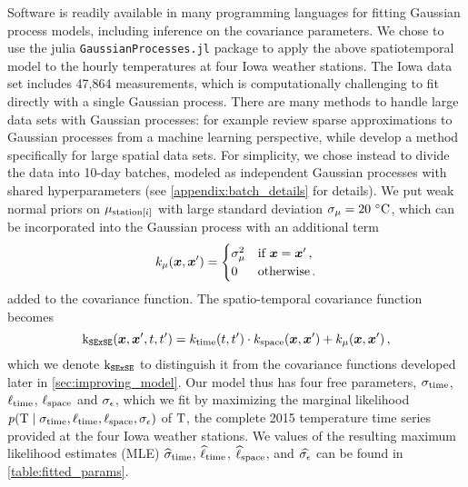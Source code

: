 Software is readily available in many programming languages for fitting Gaussian process models, including inference on the covariance parameters. We chose to use the julia \texttt{GaussianProcesses.jl} package \citep{fairbrother2018gaussianprocesses} to apply the above spatiotemporal model to the hourly temperatures at four Iowa weather stations.
The Iowa data set includes 47,864 measurements, which is computationally challenging to fit directly with a single Gaussian process.
There are many methods to handle large data sets with Gaussian processes: for example \citet{quinonero2007approximation} review sparse approximations to Gaussian processes from a machine learning perspective, while \citet{banerjee2008gaussian} develop a method specifically for large spatial data sets.
For simplicity, we chose instead to divide the data into 10-day batches, modeled as independent Gaussian processes with shared hyperparameters (see \autoref{appendix:batch_details} for details).
We put weak normal priors on \(\mu_{\mathrm{station}\left\lbrack i\right\rbrack}\) with large standard deviation \(\sigma_{\mu}=20\,{\,^\circ}{}\mathrm{C}\), which can be incorporated into the Gaussian process with an additional term
\begin{equation}
    k_{\mu}(\bm{x}, \bm{x}') = \begin{cases}
\sigma_\mu^2 &\text{if } \bm{x} = \bm{x}'\,, \\
0 &\text{otherwise}\,.
\end{cases}
\end{equation}
added to the covariance function.
The spatio-temporal covariance function becomes
\begin{equation}
    \operatorname{k_{\mathtt{SExSE}}}(\bm{x},\bm{x}',t,t') = k_{\mathrm{time}}(t,t') \cdot k_{\mathrm{space}}(\bm{x}, \bm{x}') + k_\mu(\bm{x}, \bm{x}') \,,
    \label{eq:ksese}
\end{equation}
which we denote \(\operatorname{k_{\mathtt{SExSE}}}\) to distinguish it from the covariance functions developed later in \autoref{sec:improving_model}.
Our model thus has four free parameters, \(\sigma_{\mathrm{time}}\), \(\ell_{\mathrm{time}}\), \(\ell_{\mathrm{space}}\) and \(\sigma_{\epsilon}\), which we fit by maximizing the marginal likelihood \( \prob\del{ \Temp \mid {\sigma_{\subtime},\ell_{\subtime},\ell_{\subspace},\sigman} }\) of \(\mathrm{T}\), the complete 2015 temperature time series provided at the four Iowa weather stations.
We values of the resulting maximum likelihood estimates (MLE) 
\(\widehat\sigma_{\mathrm{time}}\), \(\widehat\ell_{\mathrm{time}}\), \(\widehat\ell_{\mathrm{space}}\), and \(\widehat{\sigma_{\epsilon}}\)
can be found in \autoref{table:fitted_params}.

